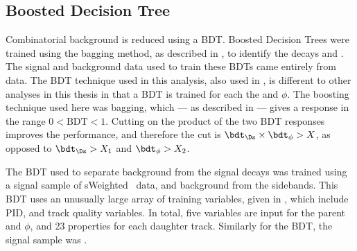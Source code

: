 


\subsection{Boosted Decision Tree}
Combinatorial background is reduced using a BDT.
Boosted Decision Trees were trained using the bagging method, as described in , to
identify the decays \decay{\Ds}{\kkpi} and \decay{\phi}{\kk}.
The signal and background data used to train these BDTs came entirely from data.
The BDT technique used in this analysis, also used in , is different to
other analyses in this thesis in that a BDT is trained for each the \Ds and $\phi$.
The boosting technique used here was bagging, which --- as described in  --- gives
a response in the range $0<\mathrm{BDT}<1$.
Cutting on the product of the two BDT responses improves the performance, and therefore the cut is
$\bdt_{\Ds}\times\bdt_\phi>X$, as opposed to $\bdt_{\Ds}>X_1$ and $\bdt_\phi>X_2$.

The BDT used to separate background from the signal \decay{\Ds}{\kkpi} decays was trained using
a signal sample of \decay{\Bs}{\Dsm\pip} sWeighted~\cite{splot} data, and background from the \Dsm
sidebands.
This BDT uses an unusually large array of training variables, given in ,
which include PID, and track quality variables.
In total, five variables are input for the parent \Ds and $\phi$, and 23 properties for each
daughter track.
Similarly for the \decay{\phi}{\kk} BDT, the signal sample was \decay{\Bs}{\jpsi\phi}.



